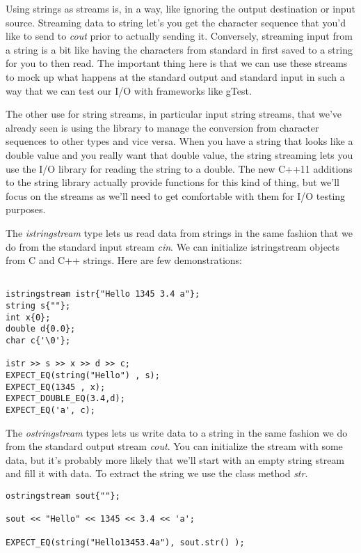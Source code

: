 \documentclass[]{tufte-handout}
\begin{document}
Using strings as streams is, in a way, like ignoring the output destination or input source. Streaming data to string let's you get the character sequence that you'd like to send to \textit{cout} prior to actually sending it.  Conversely, streaming input from a string is a bit like having the characters from standard in first saved to a string for you to then read.  The important thing here is that we can use these streams to mock up what happens at the standard output and standard input in such a way that we can test our I/O with frameworks like gTest. 

The other use for string streams, in particular input string streams, that we've already seen is using the library to manage the conversion from character sequences to other types and vice versa. When you have a string that looks like a double value and you really want that double value, the string streaming lets you use the I/O library for reading the string to a double. The new C++11 additions to the string library actually provide functions for this kind of thing, but we'll focus on the streams as we'll need to get comfortable with them for I/O testing purposes. 

The \textit{istringstream} type lets us read data from strings in the same fashion that we do from the standard input stream \textit{cin}. We can initialize istringstream objects from C and C++ strings. Here are few demonstrations:
\begin{verbatim}

istringstream istr{"Hello 1345 3.4 a"};
string s{""};
int x{0};
double d{0.0};
char c{'\0'};

istr >> s >> x >> d >> c;
EXPECT_EQ(string("Hello") , s);
EXPECT_EQ(1345 , x);
EXPECT_DOUBLE_EQ(3.4,d);
EXPECT_EQ('a', c);
\end{verbatim}

The \textit{ostringstream} types lets us write data to a string in the same fashion we do from the standard output stream \textit{cout}. You can initialize the stream with some data, but it's probably more likely that we'll start with an empty string stream and fill it with data. To extract the string we use the class method \textit{str}.
\begin{verbatim}
ostringstream sout{""};

sout << "Hello" << 1345 << 3.4 << 'a';

EXPECT_EQ(string("Hello13453.4a"), sout.str() );
\end{verbatim}
\end{document}
